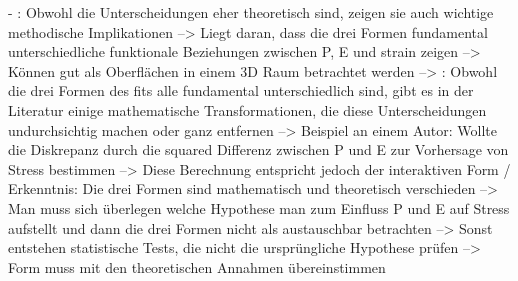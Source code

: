- \cite[S. 5]{edwards:1990}: Obwohl die Unterscheidungen eher theoretisch sind, zeigen sie auch wichtige methodische Implikationen --> Liegt daran, dass die drei Formen fundamental unterschiedliche funktionale Beziehungen zwischen P, E und strain zeigen --> Können gut als Oberflächen in einem 3D Raum betrachtet werden --> \cite[S. 7]{edwards:1990}: Obwohl die drei Formen des fits alle fundamental unterschiedlich sind, gibt es in der Literatur einige mathematische Transformationen, die diese Unterscheidungen undurchsichtig machen oder ganz entfernen --> Beispiel an einem Autor: Wollte die Diskrepanz durch die squared Differenz zwischen P und E zur Vorhersage von Stress bestimmen --> Diese Berechnung entspricht jedoch der interaktiven Form / Erkenntnis: Die drei Formen sind mathematisch und theoretisch verschieden --> Man muss sich überlegen welche Hypothese man zum Einfluss P und E auf Stress aufstellt und dann die drei Formen nicht als austauschbar betrachten --> Sonst entstehen statistische Tests, die nicht die ursprüngliche Hypothese prüfen --> Form muss mit den theoretischen Annahmen übereinstimmen \\


